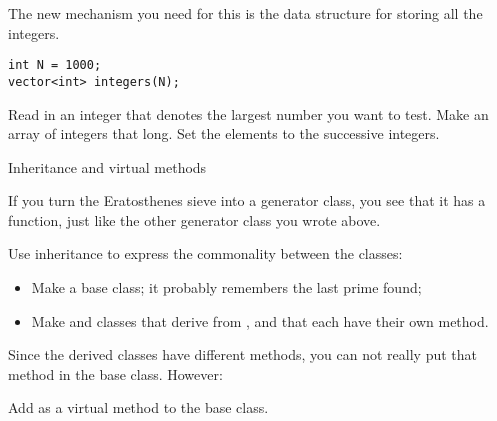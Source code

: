 The new mechanism you need for this is the data structure for storing
all the integers.
\begin{verbatim}
int N = 1000;
vector<int> integers(N);
\end{verbatim}

\begin{exercise}
  Read in an integer that denotes the largest number you want to test.
  Make an array of integers that long. Set the elements to the
  successive integers.
\end{exercise}

 {Inheritance and virtual methods}

If you turn the Eratosthenes sieve into a generator class, you see
that it has a  function, just like the other generator
class you wrote above.

\begin{exercise}
  Use inheritance to express the commonality between the classes:
  \begin{itemize}
  \item Make a  base class; it probably remembers the
    last prime found;
  \item Make  and  classes
    that derive from , and that each have their own
     method.
  \end{itemize}
\end{exercise}

Since the derived classes have different  methods, you
can not really put that method in the base class. However:

\begin{exercise}
  Add  as a virtual method to the base class.
\end{exercise}
